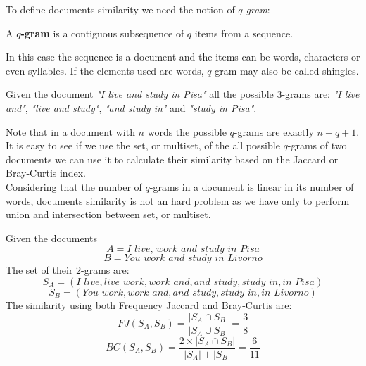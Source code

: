 To define documents similarity we need the notion of \textit{$q$-gram}:

\begin{definizione}
	A \textbf{$q$-gram} is a contiguous subsequence of $q$ items from a sequence.
\end{definizione}

In this case the sequence is a document and the items can be words, characters or even syllables. If the elements used are words, $q$-gram may also be called shingles.

\begin{esempio}
	Given the document \textit{"I live and study in Pisa"} all the possible $3$-grams are: 
	\textit{"I live and"}, \textit{"live and study"}, \textit{"and study in"} and \textit{"study in Pisa"}.
\end{esempio}

Note that in a document with $n$ words the possible $q$-grams are exactly $n-q+1$.\\

It is easy to see if we use the set, or multiset, of the all possible $q$-grams of two documents we can use it to calculate their similarity based on the Jaccard or Bray-Curtis index.\\

Considering that the number of $q$-grams in a document is linear in its number of words, documents similarity is not an hard problem as we have only to perform union and intersection between set, or multiset.\\

\begin{esempio}
	Given the documents 
	\begin{equation*}
	A = \textit{I live, work and study in Pisa}
	\end{equation*}
	\begin{equation*}
	B = \textit{You work and study in Livorno}
	\end{equation*}
	The set of their $2$-grams are:
	\begin{equation*}
	S_{A} = (\textit{I live}, \textit{live work}, \textit{work and}, \textit{and study}, \textit{study in}, \textit{in Pisa})
	\end{equation*}
	\begin{equation*}
	S_{B} = (\textit{You work}, \textit{work and}, \textit{and study}, \textit{study in}, \textit{in Livorno})
	\end{equation*}
	The similarity using both Frequency Jaccard and Bray-Curtis are:\\
	\begin{equation*}
		FJ(S_{A},S_{B}) = \frac{|S_{A} \cap S_{B} |}{|S_{A} \cup S_{B} |} = \frac{3}{8}
	\end{equation*}
	\begin{equation*}
		BC(S_{A},S_{B}) = \frac{2 \times |S_{A} \cap S_{B} |}{|S_{A}| +|S_{B}|} = \frac{6}{11}
	\end{equation*}
\end{esempio}

